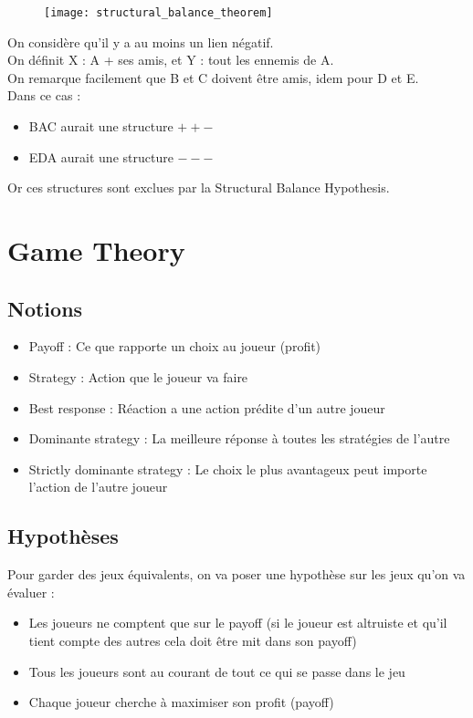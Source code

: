 \begin{figure}[H]
    \centering
    \texttt{[image: structural\_balance\_theorem]}
\end{figure}

On considère qu'il y a au moins un lien négatif.\\
On définit X : A + ses amis, et Y : tout les ennemis de A.\\
On remarque facilement que B et C doivent être amis, idem pour D et E.\\
Dans ce cas :
\begin{itemize}
	\item BAC aurait une structure $++-$
	\item EDA aurait une structure $---$
\end{itemize}
Or ces structures sont exclues par la Structural Balance Hypothesis.

\chapter{Game Theory}

\section{Notions}

\begin{itemize}
	\item Payoff : Ce que rapporte un choix au joueur (profit)
	\item Strategy : Action que le joueur va faire
	\item Best response : Réaction a une action prédite d'un autre joueur
	\item Dominante strategy : La meilleure réponse à toutes les stratégies de l'autre
	\item Strictly dominante strategy : Le choix le plus avantageux peut importe l'action de l'autre joueur
\end{itemize}

\section{Hypothèses}

Pour garder des jeux équivalents, on va poser une hypothèse sur les jeux qu'on va évaluer :
\begin{itemize}
	\item Les joueurs ne comptent que sur le payoff (si le joueur est altruiste et qu'il tient compte des autres cela doit être mit dans son payoff)
	\item Tous les joueurs sont au courant de tout ce qui se passe dans le jeu
	\item Chaque joueur cherche à maximiser son profit (payoff)
\end{itemize}

